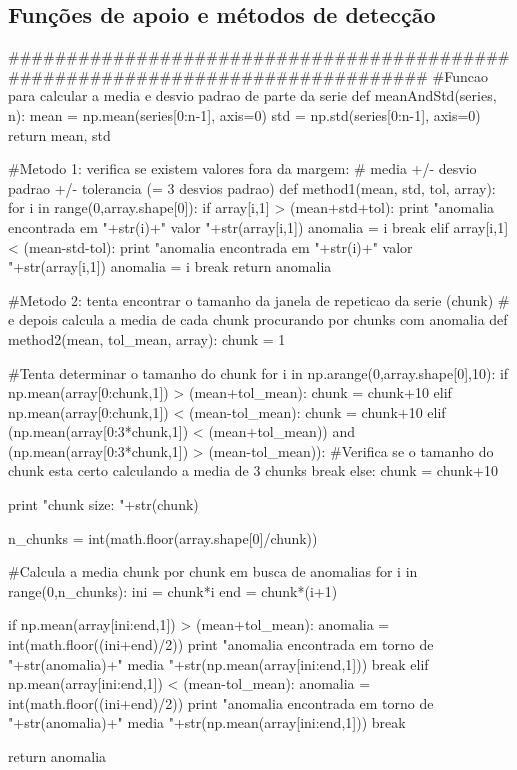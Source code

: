 \documentclass{article}
\begin{document}
\subsection{Funções de apoio e métodos de detecção}
\begin{tcolorbox}
\begin{python}
###############################################################################
#Funcao para calcular a media e desvio padrao de parte da serie
def meanAndStd(series, n):
	mean = np.mean(series[0:n-1], axis=0)
	std = np.std(series[0:n-1], axis=0)
	return mean, std

#Metodo 1: verifica se existem valores fora da margem:
# media +/- desvio padrao +/- tolerancia (= 3 desvios padrao)
def method1(mean, std, tol, array):
	for i in range(0,array.shape[0]):
		if array[i,1] > (mean+std+tol):
			print "anomalia encontrada em "+str(i)+" valor "+str(array[i,1])
			anomalia = i
			break
		elif array[i,1] < (mean-std-tol):
			print "anomalia encontrada em "+str(i)+" valor "+str(array[i,1])
			anomalia = i
			break
	return anomalia

#Metodo 2: tenta encontrar o tamanho da janela de repeticao da serie (chunk)
# e depois calcula a media de cada chunk procurando por chunks com anomalia
def method2(mean, tol_mean, array):
	chunk = 1

	#Tenta determinar o tamanho do chunk
	for i in np.arange(0,array.shape[0],10):
		if np.mean(array[0:chunk,1]) > (mean+tol_mean):
			chunk = chunk+10
		elif np.mean(array[0:chunk,1]) < (mean-tol_mean):
			chunk = chunk+10
		elif (np.mean(array[0:3*chunk,1]) < (mean+tol_mean)) and (np.mean(array[0:3*chunk,1]) > (mean-tol_mean)):
			#Verifica se o tamanho do chunk esta certo calculando a media de 3 chunks
			break
		else:
			chunk = chunk+10

	print "chunk size: "+str(chunk)

	n_chunks = int(math.floor(array.shape[0]/chunk))

	#Calcula a media chunk por chunk em busca de anomalias
	for i in range(0,n_chunks):
		ini = chunk*i
		end = chunk*(i+1)

		if np.mean(array[ini:end,1]) > (mean+tol_mean):			
			anomalia = int(math.floor((ini+end)/2))
			print "anomalia encontrada em torno de "+str(anomalia)+" media "+str(np.mean(array[ini:end,1]))
			break
		elif np.mean(array[ini:end,1]) < (mean-tol_mean):
			anomalia = int(math.floor((ini+end)/2))
			print "anomalia encontrada em torno de "+str(anomalia)+" media "+str(np.mean(array[ini:end,1]))
			break

	return anomalia
\end{python}
\end{tcolorbox}
\end{document}
